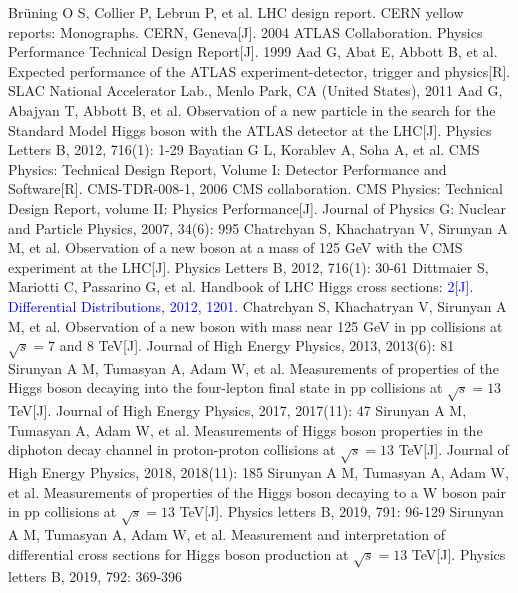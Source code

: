 \documentclass{SCIS2020cn}
\newcommand{\add}{\textcolor{blue}}
\begin{document}
\begin{thebibliography}{99}
 Brüning O S, Collier P, Lebrun P, et al. LHC design report. CERN yellow reports: Monographs. CERN, Geneva[J]. 2004
 ATLAS Collaboration. Physics Performance Technical Design Report[J]. 1999
 Aad G, Abat E, Abbott B, et al. Expected performance of the ATLAS experiment-detector, trigger and physics[R]. SLAC National Accelerator Lab., Menlo Park, CA (United States), 2011
 Aad G, Abajyan T, Abbott B, et al. Observation of a new particle in the search for the Standard Model Higgs boson with the ATLAS detector at the LHC[J]. Physics Letters B, 2012, 716(1): 1-29
 Bayatian G L, Korablev A, Soha A, et al. CMS Physics: Technical Design Report, Volume I: Detector Performance and Software[R]. CMS-TDR-008-1, 2006
 CMS collaboration. CMS Physics: Technical Design Report, volume II: Physics Performance[J]. Journal of Physics G: Nuclear and Particle Physics, 2007, 34(6): 995
 Chatrchyan S, Khachatryan V, Sirunyan A M, et al. Observation of a new boson at a mass of 125 GeV with the CMS experiment at the LHC[J]. Physics Letters B, 2012, 716(1): 30-61
 Dittmaier S, Mariotti C, Passarino G, et al. Handbook of LHC Higgs cross sections: \add{2[J]. Differential Distributions, 2012, 1201.}
 Chatrchyan S, Khachatryan V, Sirunyan A M, et al. Observation of a new boson with mass near 125 GeV in pp collisions at $\sqrt {s}= 7$ and 8 TeV[J]. Journal of High Energy Physics, 2013, 2013(6): 81
 Sirunyan A M, Tumasyan A, Adam W, et al. Measurements of properties of the Higgs boson decaying into the four-lepton final state in pp collisions at $\sqrt {s}= 13$ TeV[J]. Journal of High Energy Physics, 2017, 2017(11): 47
 Sirunyan A M, Tumasyan A, Adam W, et al. Measurements of Higgs boson properties in the diphoton decay channel in proton-proton collisions at $\sqrt {s}= 13$ TeV[J]. Journal of High Energy Physics, 2018, 2018(11): 185
 Sirunyan A M, Tumasyan A, Adam W, et al. Measurements of properties of the Higgs boson decaying to a W boson pair in pp collisions at $\sqrt {s}= 13$ TeV[J]. Physics letters B, 2019, 791: 96-129
 Sirunyan A M, Tumasyan A, Adam W, et al. Measurement and interpretation of differential cross sections for Higgs boson production at $\sqrt {s}= 13$ TeV[J]. Physics letters B, 2019, 792: 369-396

\end{thebibliography}
\end{document}

